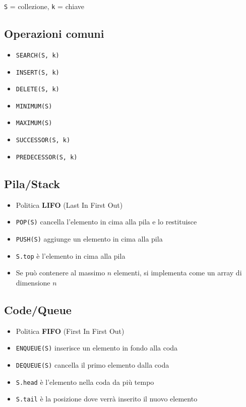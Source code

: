 \documentclass[10pt,a4paper]{article}
\newcommand{\code}{\texttt}
\begin{document}
\begin{multicols*}{2}
\code{S} = collezione, \code{k} = chiave
\subsection*{Operazioni comuni}
\begin{itemize}
    \item \code{SEARCH(S, k)}
    \item \code{INSERT(S, k)}
    \item \code{DELETE(S, k)}
    \item \code{MINIMUM(S)}
    \item \code{MAXIMUM(S)}
    \item \code{SUCCESSOR(S, k)}
    \item \code{PREDECESSOR(S, k)}
\end{itemize}
\subsection*{Pila/Stack}
\begin{itemize}
    \item Politica \textbf{LIFO} (Last In First Out)
    \item \code{POP(S)} cancella l'elemento in cima alla pila e lo restituisce
    \item \code{PUSH(S)} aggiunge un elemento in cima alla pila
    \item \code{S.top} è l'elemento in cima alla pila
    \item Se può contenere al massimo $n$ elementi, si implementa come un array di dimensione $n$
\end{itemize}
\subsection*{Code/Queue}
\begin{itemize}
    \item Politica \textbf{FIFO} (First In First Out)
    \item \code{ENQUEUE(S)} inserisce un elemento in fondo alla coda
    \item \code{DEQUEUE(S)} cancella il primo elemento dalla coda
    \item \code{S.head} è l'elemento nella coda da più tempo
    \item \code{S.tail} è la posizione dove verrà inserito il nuovo elemento
\end{itemize}

\end{multicols*}
\end{document}
